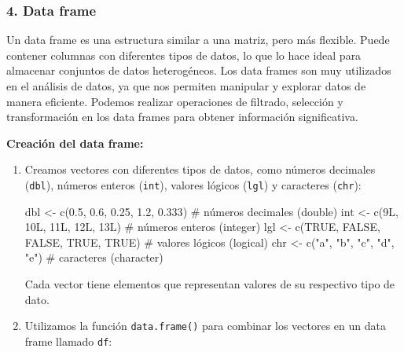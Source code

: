 \documentclass[
  letterpaper,
  DIV=11,
  numbers=noendperiod]{scrartcl}
\newenvironment{Shaded}{}{}
\newcommand{\CommentTok}[1]{\textcolor[rgb]{0.42,0.45,0.49}{#1}}
\newcommand{\ConstantTok}[1]{\textcolor[rgb]{0.00,0.36,0.77}{#1}}
\newcommand{\FloatTok}[1]{\textcolor[rgb]{0.00,0.36,0.77}{#1}}
\newcommand{\FunctionTok}[1]{\textcolor[rgb]{0.44,0.26,0.76}{#1}}
\newcommand{\NormalTok}[1]{\textcolor[rgb]{0.14,0.16,0.18}{#1}}
\newcommand{\OtherTok}[1]{\textcolor[rgb]{0.44,0.26,0.76}{#1}}
\newcommand{\StringTok}[1]{\textcolor[rgb]{0.01,0.18,0.38}{#1}}
\begin{document}
\hypertarget{data-frame}{%
\subsubsection{4. Data frame}\label{data-frame}}

Un data frame es una estructura similar a una matriz, pero más flexible.
Puede contener columnas con diferentes tipos de datos, lo que lo hace
ideal para almacenar conjuntos de datos heterogéneos. Los data frames
son muy utilizados en el análisis de datos, ya que nos permiten
manipular y explorar datos de manera eficiente. Podemos realizar
operaciones de filtrado, selección y transformación en los data frames
para obtener información significativa.

\textbf{Creación del data frame:}

\begin{enumerate}
\def\labelenumi{\arabic{enumi}.}
\item
  Creamos vectores con diferentes tipos de datos, como números decimales
  (\texttt{dbl}), números enteros (\texttt{int}), valores lógicos
  (\texttt{lgl}) y caracteres (\texttt{chr}):

\begin{Shaded}
\begin{Highlighting}[]
\NormalTok{dbl }\OtherTok{\textless{}{-}} \FunctionTok{c}\NormalTok{(}\FloatTok{0.5}\NormalTok{, }\FloatTok{0.6}\NormalTok{, }\FloatTok{0.25}\NormalTok{, }\FloatTok{1.2}\NormalTok{, }\FloatTok{0.333}\NormalTok{) }\CommentTok{\# números decimales (double)}
\NormalTok{int }\OtherTok{\textless{}{-}} \FunctionTok{c}\NormalTok{(9L, 10L, 11L, 12L, 13L) }\CommentTok{\# números enteros (integer)}
\NormalTok{lgl }\OtherTok{\textless{}{-}} \FunctionTok{c}\NormalTok{(}\ConstantTok{TRUE}\NormalTok{, }\ConstantTok{FALSE}\NormalTok{, }\ConstantTok{FALSE}\NormalTok{, }\ConstantTok{TRUE}\NormalTok{, }\ConstantTok{TRUE}\NormalTok{) }\CommentTok{\# valores lógicos (logical)}
\NormalTok{chr }\OtherTok{\textless{}{-}} \FunctionTok{c}\NormalTok{(}\StringTok{"a"}\NormalTok{, }\StringTok{"b"}\NormalTok{, }\StringTok{"c"}\NormalTok{, }\StringTok{"d"}\NormalTok{, }\StringTok{"e"}\NormalTok{) }\CommentTok{\# caracteres (character)}
\end{Highlighting}
\end{Shaded}

  Cada vector tiene elementos que representan valores de su respectivo
  tipo de dato.
\item
  Utilizamos la función \texttt{data.frame()} para combinar los vectores
  en un data frame llamado \texttt{df}:


\end{enumerate}
\end{document}
